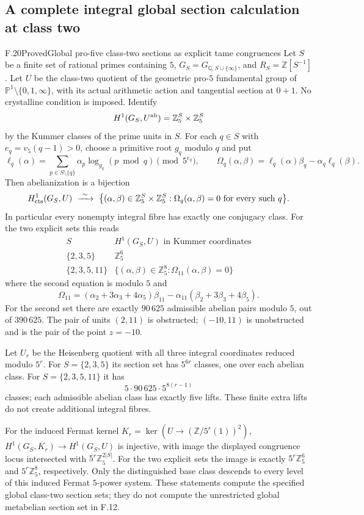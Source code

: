 \subsection{A complete integral global section calculation at class two}

\begin{statement}{F.20}{Proved}{Global pro-five class-two sections as explicit tame congruences}
Let $S$ be a finite set of rational primes containing $5$,
$G_S=G_{\mathbb Q,S\cup\{\infty\}}$, and
$R_S=\mathbb Z[S^{-1}]$. Let $U$ be the class-two
quotient of the geometric pro-$5$ fundamental group
of $\mathbb P^1\setminus\{0,1,\infty\}$, with its
actual arithmetic action and tangential section at $0+1$.
No crystalline condition is imposed. Identify
\[
 H^1(G_S,U^{\rm ab})
    =\mathbb Z_5^S\times\mathbb Z_5^S
\]
by the Kummer classes of the prime units in $S$.
For each $q\in S$ with $e_q=v_5(q-1)>0$, choose a
primitive root $g_q$ modulo $q$ and put
\[
 \ell_q(\alpha)=\sum_{p\in S\setminus\{q\}}
             \alpha_p\log_{g_q}(p\bmod q)
                  \pmod {5^{e_q}},\qquad
 \Omega_q(\alpha,\beta)
       =\ell_q(\alpha)\beta_q-\alpha_q\ell_q(\beta).
\]
Then abelianization is a bijection
\[
 H^1_{\rm cts}(G_S,U)\ \xrightarrow{\ \sim\ }\
 \bigl\{(\alpha,\beta)\in\mathbb Z_5^S\times\mathbb Z_5^S:
          \Omega_q(\alpha,\beta)=0
              \text{ for every such }q\bigr\}.
\]
In particular every nonempty integral fibre has exactly
one conjugacy class. For the two explicit sets this reads
\[
 \begin{array}{c|c}
 S&H^1(G_S,U)\text{ in Kummer coordinates}\\\hline
 \{2,3,5\}&\mathbb Z_5^6\\
 \{2,3,5,11\}&
 \{(\alpha,\beta)\in\mathbb Z_5^8:
                         \Omega_{11}(\alpha,\beta)=0\}
 \end{array}
\]
where the second equation is modulo $5$ and
\[
 \Omega_{11}=(\alpha_2+3\alpha_3+4\alpha_5)\beta_{11}
          -\alpha_{11}(\beta_2+3\beta_3+4\beta_5).
\]
For the second set there are exactly $90\,625$
admissible abelian pairs modulo $5$, out of $390\,625$.
The pair of units $(2,11)$ is obstructed; $(-10,11)$
is unobstructed and is the pair of the point $z=-10$.

Let $U_r$ be the Heisenberg quotient with all three
integral coordinates reduced modulo $5^r$. For
$S=\{2,3,5\}$ its section set has $5^{6r}$ classes,
one over each abelian class. For
$S=\{2,3,5,11\}$ it has
\[
       5\cdot90\,625\cdot5^{8(r-1)}
\]
classes; each admissible abelian class has exactly
five lifts. These finite extra lifts do not create
additional integral fibres.

For the induced Fermat kernel
$K_r=\ker(U\to(\mathbb Z/5^r(1))^2)$,
$H^1(G_S,K_r)\to H^1(G_S,U)$ is injective, with
image the displayed congruence locus intersected
with $5^r\mathbb Z_5^{2|S|}$.
For the two explicit sets the image is exactly
$5^r\mathbb Z_5^6$ and $5^r\mathbb Z_5^8$,
respectively. Only the distinguished base class
descends to every level of this induced Fermat
$5$-power system. These statements compute the
specified global class-two section sets; they do
not compute the unrestricted global metabelian
section set in F.12.
\end{statement}
